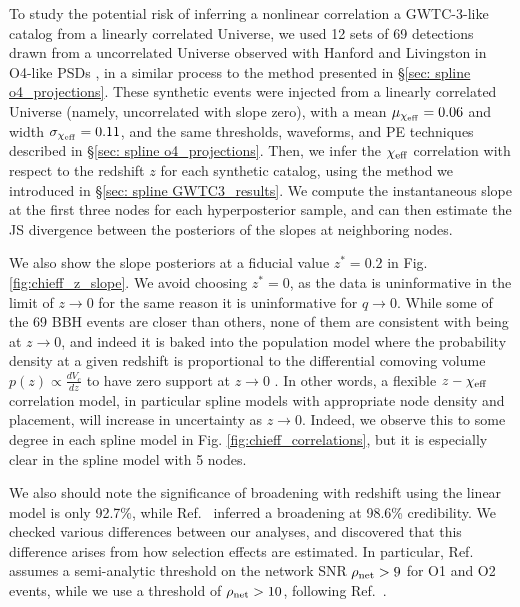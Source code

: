 \begin{refsection}
To study the potential risk of inferring a nonlinear correlation a \ac{GWTC-3}-like catalog from a linearly correlated Universe, we used 12 sets of 69 detections drawn from a uncorrelated Universe observed with Hanford and Livingston in O4-like PSDs \cite{O3_psds}, in a similar process to the method presented in \S \ref{sec: spline o4_projections}. These synthetic events were injected from a linearly correlated Universe (namely, uncorrelated with slope zero), with a mean $\mu_{\chi_{\rm eff}} = 0.06$ and width $\sigma_{\chi_{\rm eff}} = 0.11$, and the same thresholds, waveforms, and PE techniques described in \S \ref{sec: spline o4_projections}. Then, we infer the $\chi_{\rm eff}$ correlation with respect to the redshift $z$ for each synthetic catalog, using the method we introduced in \S \ref{sec: spline GWTC3_results}. We compute the instantaneous slope at the first three nodes for each hyperposterior sample, and can then estimate the \ac{JS} divergence between the posteriors of the slopes at neighboring nodes. 

We also show the slope posteriors at a fiducial value $z^*=0.2$ in Fig. \ref{fig:chieff_z_slope}. We avoid choosing $z^*=0$, as the data is uninformative in the limit of $z\to 0$ for the same reason it is uninformative for $q\to 0$. While some of the 69 BBH events are closer than others, none of them are consistent with being at $z\to 0$, and indeed it is baked into the population model where the probability density at a given redshift is proportional to the differential comoving volume $p(z) \propto \frac{dV_c}{dz}$ to have zero support at $z\to 0$ \cite{Hogg:1999ad, Fishbach:2018edt}. In other words, a flexible $z-\chi_{\rm eff}$ correlation model, in particular spline models with appropriate node density and placement, will increase in uncertainty as $z\to 0$. Indeed, we observe this to some degree in each spline model in Fig. \ref{fig:chieff_correlations}, but it is especially clear in the spline model with 5 nodes. 

We also should note the significance of broadening with redshift using the linear model is only 92.7\%, while Ref.~\cite{Biscoveanu:2022qac} inferred a broadening at 98.6\% credibility. We checked various differences between our analyses, and discovered that this difference arises from how selection effects are estimated. In particular, Ref.~\cite{Biscoveanu:2022qac} assumes a semi-analytic threshold on the network SNR $\rho_{\rm net} > 9$ for O1 and O2 events, while we use a threshold of $\rho_{\rm net} > 10$, following Ref.~\cite{KAGRA:2021duu}.


\end{refsection}
